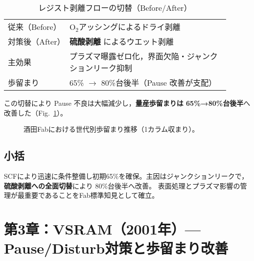 \documentclass[conference]{IEEEtran}
\begin{document}
\begin{table}[t]
  \centering
  \caption{レジスト剥離フローの切替（Before/After）}
  \label{tab:resist_flow}
  \footnotesize
  \begin{tabular}{p{0.25\linewidth} p{0.65\linewidth}}
    \toprule
    従来（Before） & O$_2$アッシングによるドライ剥離 \\
    対策後（After） & \textbf{硫酸剥離} によるウエット剥離 \\
    主効果 & プラズマ曝露ゼロ化，界面欠陥・ジャンクションリーク抑制 \\
    歩留まり & 65\% $\rightarrow$ 80\%台後半（Pause 改善が支配） \\
    \bottomrule
  \end{tabular}
\end{table}

この切替により Pause 不良は大幅減少し，\textbf{量産歩留まりは 65\%→80\%台後半}へ改善した（Fig.~\ref{fig:yield_trend}）。

\begin{figure}[t]
\centering
{}
\caption{酒田Fabにおける世代別歩留まり推移（1カラム収まり）。}
\label{fig:yield_trend}
\end{figure}

\subsection*{小括}
SCFにより迅速に条件整備し初期65\%を確保。主因はジャンクションリークで，\textbf{硫酸剥離への全面切替}により 80\%台後半へ改善。
表面処理とプラズマ影響の管理が最重要であることをFab標準知見として確立。

\section{第3章：VSRAM（2001年）— Pause/Disturb対策と歩留まり改善}
\end{document}
